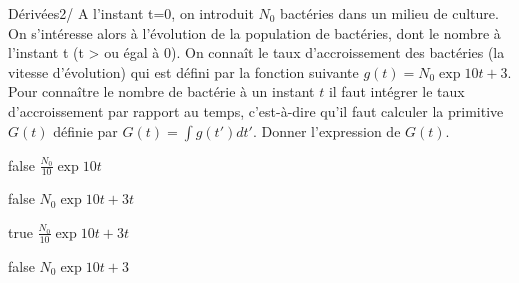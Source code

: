             \begin{question}{22}{Dérivées}{2}{/}
			 A l'instant t=0, on introduit $N_0$ bactéries dans un milieu de culture. On s'intéresse alors à l'évolution de la population de bactéries, dont le nombre à l'instant t (t > ou égal à 0). On connaît le taux d'accroissement des bactéries (la vitesse d'évolution) qui est défini par la fonction suivante $g(t) = N_0 \exp{10t}+3$. Pour connaître le nombre de bactérie à un instant $t$ il faut intégrer le taux d'accroissement par rapport au temps, c'est-à-dire qu'il faut calculer la primitive $G(t)$ définie par $G(t)= \int g(t')dt'$. Donner l'expression de $G(t)$.
            \end{question}
            \begin{reponses}
            	\item[false]   $\frac{N_0}{10}\exp{10t} $
            	\item[false]   $N_0\exp{10t} +3t $
                \item[true]   $\frac{N_0}{10}\exp{10t} +3t $
                \item[false]   $N_0\exp{10t} +3 $
            \end{reponses}
